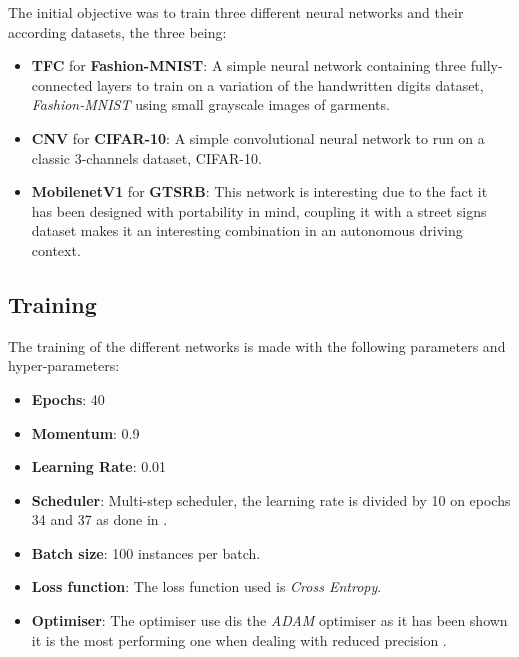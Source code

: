 The initial objective was to train three different neural networks and their according datasets, the three being:
\begin{itemize}
  \item \textbf{TFC} for \textbf{Fashion-MNIST}: A simple neural network containing three fully-connected layers to train on a variation of the handwritten digits dataset, \emph{Fashion-MNIST} using small grayscale images of garments.
  \item \textbf{CNV} for \textbf{CIFAR-10}: A simple convolutional neural network to run on a classic 3-channels dataset, CIFAR-10.
  \item \textbf{MobilenetV1} for \textbf{GTSRB}: This network is interesting due to the fact it has been designed with portability in mind, coupling it with a street signs dataset makes it an interesting combination in an autonomous driving context.
\end{itemize}


\subsection{Training}

The training of the different networks is made with the following parameters and hyper-parameters:
\begin{itemize}
  \item \textbf{Epochs}: 40
  \item \textbf{Momentum}: 0.9
  \item \textbf{Learning Rate}: 0.01
  \item \textbf{Scheduler}: Multi-step scheduler, the learning rate is divided by 10 on epochs 34 and 37 as done in \cite{Bethge2018}.
  \item \textbf{Batch size}: 100 instances per batch.
  \item \textbf{Loss function}: The loss function used is \emph{Cross Entropy}.
  \item \textbf{Optimiser}: The optimiser use dis the \emph{ADAM} optimiser as it has been shown it is the most performing one when dealing with reduced precision \cite{Alizadeh2018}.
\end{itemize}

